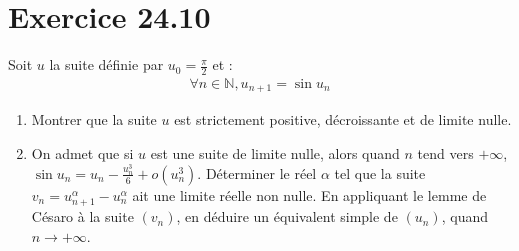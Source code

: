 \documentclass[../main.tex]{subfiles}
\begin{document}
\section*{Exercice 24.10}
\begin{tcolorbox}[title=Exercice 24.10, title filled=false, colframe=darkgreen, colback=darkgreen!10!white]
    Soit $u$ la suite définie par $u_0 = \frac{\pi}{2}$ et : 
    \begin{align*}
        \forall n\in \mathbb{N}, u_{n+1} = \sin u_n
    \end{align*}
    \begin{enumerate}
        \item Montrer que la suite $u$ est strictement positive, décroissante et de limite nulle. 
        \item On admet que si $u$ est une suite de limite nulle, alors quand $n$ tend vers $+\infty$, $\sin u_n = u_n - \frac{u_n^3}{6} + o(u_n^3)$. Déterminer le réel $\alpha$ tel que la suite $v_n = u_{n+1}^\alpha - u_n^\alpha$ ait une limite réelle non nulle. En appliquant le lemme de Césaro à la suite $(v_n)$, en déduire un équivalent simple de $(u_n)$, quand $n\to +\infty$. 
    \end{enumerate}
\end{tcolorbox}
\end{document}
